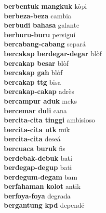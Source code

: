 \textbf{ berbentuk mangkuk  } kòpi \\
\textbf{ berbeza-beza  } cambia \\
\textbf{ berbudi bahasa  } galante \\
\textbf{ berburu-buru  } persiguí \\
\textbf{ bercabang-cabang  } separá \\
\textbf{ bercakap berdegar-degar  } blòf \\
\textbf{ bercakap besar  } blòf \\
\textbf{ bercakap gah  } blòf \\
\textbf{ bercakap ttg  } bisa \\
\textbf{ bercakap-cakap  } adrès \\
\textbf{ bercampur aduk  } meks \\
\textbf{ bercemar duli  } cana \\
\textbf{ bercita-cita tinggi  } ambisioso \\
\textbf{ bercita-cita utk  } mik \\
\textbf{ bercita-cita  } deseá \\
\textbf{ bercuaca buruk  } fis \\
\textbf{ berdebak-debuk  } bati \\
\textbf{ berdegap-degup  } bati \\
\textbf{ berdegum-degam  } bam \\
\textbf{ berfahaman kolot  } antik \\
\textbf{ berfoya-foya  } degrada \\
\textbf{ bergantung kpd  } dependé \\
